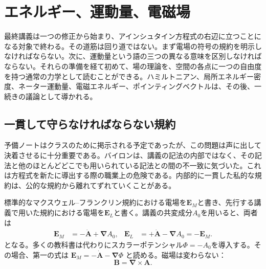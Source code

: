 \chapter{エネルギー、運動量、電磁場}

最終講義は一つの修正から始まり、アインシュタイン方程式の右辺に立つことになる対象で終わる。その道筋は回り道ではない。まず電場の符号の規約を明示しなければならない。次に、運動量という語の三つの異なる意味を区別しなければならない。それらの準備を経て初めて、場の理論を、空間の各点に一つの自由度を持つ通常の力学として読むことができる。ハミルトニアン、局所エネルギー密度、ネーター運動量、電磁エネルギー、ポインティングベクトルは、その後、一続きの議論として導かれる。

\section{一貫して守らなければならない規約}

予備ノートはクラスのために掲示される予定であったが、この問題は声に出して決着させるに十分重要である。バイロンは、講義の記法の内部ではなく、その記法と他のほとんどどこでも用いられている記法との間の不一致に気づいた。これは方程式を新たに導出する際の職業上の危険である。内部的に一貫した私的な規約は、公的な規約から離れてずれていくことがある。

標準的なマクスウェル--フランクリン規約における電場を\(\mathbf E_M\)と書き、先行する講義で用いた規約における電場を\(\mathbf E_L\)と書く。講義の共変成分\(A_0\)を用いると、両者は
\begin{align}
\mathbf E_M
  &= -\dot{\mathbf A}+\boldsymbol{\nabla}A_0,
&
\mathbf E_L
  &= +\dot{\mathbf A}-\boldsymbol{\nabla}A_0
   =-\mathbf E_M .
\label{eq:two-electric-conventions}
\end{align}
となる。多くの教科書は代わりにスカラーポテンシャル\(\Phi=-A_0\)を導入する。その場合、第一の式は
\(\mathbf E_M=-\dot{\mathbf A}-\boldsymbol{\nabla}\Phi\)
と読める。磁場は変わらない：
\begin{equation}
\mathbf B=\boldsymbol{\nabla}\times\mathbf A.
\label{eq:B-from-A-opening}
\end{equation}

